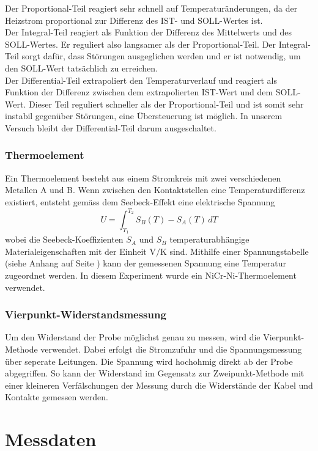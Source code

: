 \documentclass[a4paper,parskip,11pt, DIV12]{scrreprt}
\begin{document}
Der Proportional-Teil reagiert sehr schnell auf Temperaturänderungen, da der Heizstrom proportional zur Differenz des IST- und SOLL-Wertes ist.\\
Der Integral-Teil reagiert als Funktion der Differenz des Mittelwerts und des SOLL-Wertes. Er reguliert also langsamer als der Proportional-Teil. Der Integral-Teil sorgt dafür, dass Störungen ausgeglichen werden und er ist notwendig, um den SOLL-Wert tatsächlich zu erreichen.\\
Der Differential-Teil extrapoliert den Temperaturverlauf und reagiert als Funktion der Differenz zwischen dem extrapolierten IST-Wert und dem SOLL-Wert. Dieser Teil reguliert schneller als der Proportional-Teil und ist somit sehr instabil gegenüber Störungen, eine Übersteuerung ist möglich. In unserem Versuch bleibt der Differential-Teil darum ausgeschaltet. 


\subsection{Thermoelement}
Ein Thermoelement besteht aus einem Stromkreis mit zwei verschiedenen Metallen A und B. Wenn zwischen den Kontaktstellen eine Temperaturdifferenz existiert, entsteht gemäss dem Seebeck-Effekt eine elektrische Spannung 
$$ U = \int_{T_{1}}^{T_{2}} S_{B}(T) - S_{A}(T) \, dT $$
wobei die Seebeck-Koeffizienten $S_{A}$ und $S_{B}$ temperaturabhängige Materialeigenschaften mit der Einheit V$/$K sind. Mithilfe einer Spannungstabelle (siehe Anhang auf Seite \pageref{Kacktabelle}) kann der gemessenen Spannung eine Temperatur zugeordnet werden. In diesem Experiment wurde ein NiCr-Ni-Thermoelement verwendet.

\subsection{Vierpunkt-Widerstandsmessung}
Um den Widerstand der Probe möglichst genau zu messen, wird die Vierpunkt-Methode verwendet. Dabei erfolgt die Stromzufuhr und die Spannungsmessung über seperate Leitungen. Die Spannung wird hochohmig direkt ab der Probe abgegriffen. So kann der Widerstand im Gegensatz zur Zweipunkt-Methode mit einer kleineren Verfälschungen der Messung durch die Widerstände der Kabel und Kontakte gemessen werden.

\newpage

\chapter{Messdaten}
\end{document}
